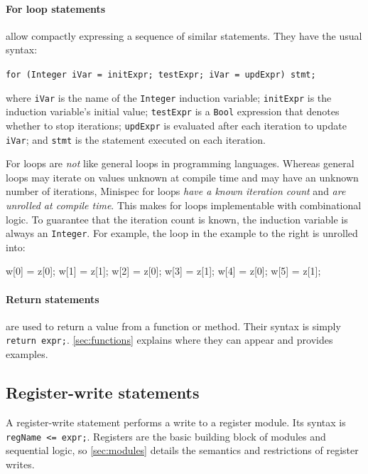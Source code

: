 \paragraph{For loop statements} allow compactly expressing a sequence of similar statements. They have the usual syntax:
\begin{center}
\verb|for (Integer iVar = initExpr; testExpr; iVar = updExpr) stmt;|\
\end{center}
where \verb|iVar| is the name of the \verb|Integer| induction variable;
\verb|initExpr| is the induction variable's initial value;
\verb|testExpr| is a \verb|Bool| expression that denotes whether to stop iterations;
\verb|updExpr| is evaluated after each iteration to update \verb|iVar|;
and \verb|stmt| is the statement executed on each iteration.

For loops are \emph{not} like general loops in programming languages.
Whereas general loops may iterate on values unknown at compile time and may have an unknown number of iterations,
Minispec for loops \emph{have a known iteration count} and \emph{are unrolled at compile time}.
This makes for loops implementable with combinational logic.
To guarantee that the iteration count is known, the induction variable is always an \verb|Integer|.
For example, the loop in the example to the right is unrolled into:

\begin{mscode}
  w[0] = z[0];  w[1] = z[1];  w[2] = z[0];  w[3] = z[1];  w[4] = z[0];  w[5] = z[1];
\end{mscode}

\paragraph{Return statements} are used to return a value from a function or method. Their syntax is simply \verb|return expr;|.
\autoref{sec:functions} explains where they can appear and provides examples.

\subsection{Register-write statements}

A register-write statement performs a write to a register module.
Its syntax is \verb|regName <= expr;|.
Registers are the basic building block of modules and sequential logic,
so \autoref{sec:modules} details the semantics and restrictions of register writes.
